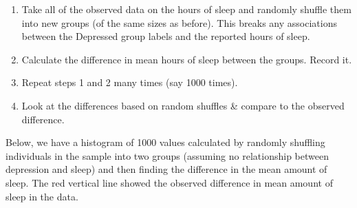 \documentclass[
]{book}
\newenvironment{Shaded}{\begin{snugshade}}{\end{snugshade}}
\newcommand{\CommentTok}[1]{\textcolor[rgb]{0.56,0.35,0.01}{\textit{#1}}}
\newcommand{\DataTypeTok}[1]{\textcolor[rgb]{0.13,0.29,0.53}{#1}}
\newcommand{\DecValTok}[1]{\textcolor[rgb]{0.00,0.00,0.81}{#1}}
\newcommand{\KeywordTok}[1]{\textcolor[rgb]{0.13,0.29,0.53}{\textbf{#1}}}
\newcommand{\NormalTok}[1]{#1}
\newcommand{\OperatorTok}[1]{\textcolor[rgb]{0.81,0.36,0.00}{\textbf{#1}}}
\newcommand{\StringTok}[1]{\textcolor[rgb]{0.31,0.60,0.02}{#1}}
\providecommand{\tightlist}{%
  \setlength{\itemsep}{0pt}\setlength{\parskip}{0pt}}
\begin{document}
\begin{enumerate}
\def\labelenumi{\arabic{enumi}.}
\tightlist
\item
  Take all of the observed data on the hours of sleep and randomly shuffle them into new groups (of the same sizes as before). This breaks any associations between the Depressed group labels and the reported hours of sleep.
\item
  Calculate the difference in mean hours of sleep between the groups. Record it.
\item
  Repeat steps 1 and 2 many times (say 1000 times).
\item
  Look at the differences based on random shuffles \& compare to the observed difference.
\end{enumerate}

\begin{Shaded}
\end{Shaded}

Below, we have a histogram of 1000 values calculated by randomly shuffling individuals in the sample into two groups (assuming no relationship between depression and sleep) and then finding the difference in the mean amount of sleep. The red vertical line showed the observed difference in mean amount of sleep in the data.
\end{document}
